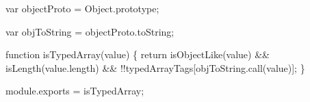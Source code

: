 \begin{DoxyCodeInclude}
var objectProto = Object.prototype;

var objToString = objectProto.toString;

\textcolor{keyword}{function} isTypedArray(value) \{
  \textcolor{keywordflow}{return} isObjectLike(value) && isLength(value.length) && !!typedArrayTags[objToString.call(value)];
\}

module.exports = isTypedArray;
\end{DoxyCodeInclude}
 